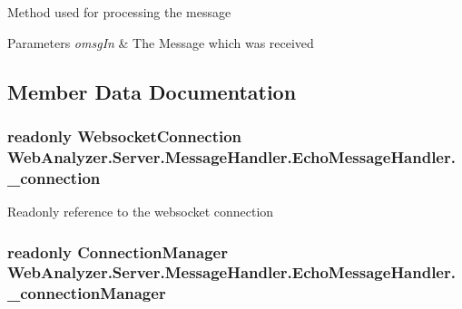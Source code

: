Method used for processing the message 


\begin{DoxyParams}{Parameters}
{\em omsg\+In} & The Message which was received\\
\hline
\end{DoxyParams}


\subsection{Member Data Documentation}
\hypertarget{class_web_analyzer_1_1_server_1_1_message_handler_1_1_echo_message_handler_a2a7b752d022345cb8b575f4a84435e1e}{}
\subsubsection[{\+\_\+connection}]{\setlength{\rightskip}{0pt plus 5cm}readonly {\bf Websocket\+Connection} Web\+Analyzer.\+Server.\+Message\+Handler.\+Echo\+Message\+Handler.\+\_\+connection\hspace{0.3cm}{\ttfamily [private]}}\label{class_web_analyzer_1_1_server_1_1_message_handler_1_1_echo_message_handler_a2a7b752d022345cb8b575f4a84435e1e}


Readonly reference to the websocket connection 

\hypertarget{class_web_analyzer_1_1_server_1_1_message_handler_1_1_echo_message_handler_a936f408ce4e67d13029830db8a3cd398}{}
\subsubsection[{\+\_\+connection\+Manager}]{\setlength{\rightskip}{0pt plus 5cm}readonly {\bf Connection\+Manager} Web\+Analyzer.\+Server.\+Message\+Handler.\+Echo\+Message\+Handler.\+\_\+connection\+Manager\hspace{0.3cm}{\ttfamily [private]}}\label{class_web_analyzer_1_1_server_1_1_message_handler_1_1_echo_message_handler_a936f408ce4e67d13029830db8a3cd398}


